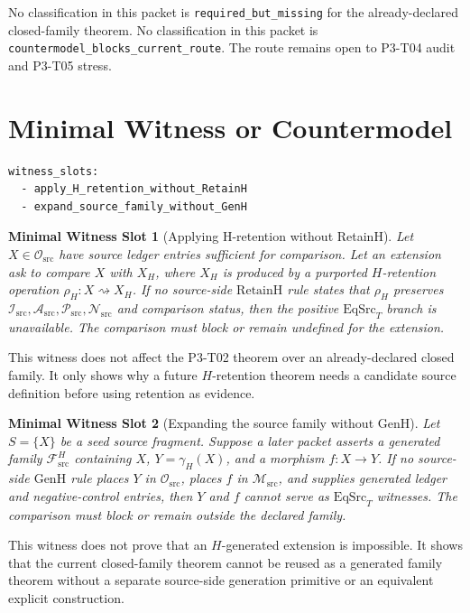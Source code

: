 \documentclass[11pt]{article}
\newcommand{\EqSrcT}{\mathrm{EqSrc}_{T}}
\newcommand{\RetainH}{\mathrm{RetainH}}
\newcommand{\GenH}{\mathrm{GenH}}
\newcommand{\Fsrc}{\mathcal{F}_{\mathrm{src}}}
\newcommand{\Osrc}{\mathcal{O}_{\mathrm{src}}}
\newcommand{\Msrc}{\mathcal{M}_{\mathrm{src}}}
\newcommand{\Isrc}{\mathcal{I}_{\mathrm{src}}}
\newcommand{\Asrc}{\mathcal{A}_{\mathrm{src}}}
\newcommand{\Psrc}{\mathcal{P}_{\mathrm{src}}}
\newcommand{\Nsrc}{\mathcal{N}_{\mathrm{src}}}
\newcommand{\Hret}{\rho_{H}}
\newcommand{\Hgen}{\gamma_{H}}
\newtheorem{witness}{Minimal Witness Slot}
\begin{document}
No classification in this packet is \texttt{required\_but\_missing} for the
already-declared closed-family theorem. No classification in this packet is
\texttt{countermodel\_blocks\_current\_route}. The route remains open to
P3-T04 audit and P3-T05 stress.

\section{Minimal Witness or Countermodel}

\begin{verbatim}
witness_slots:
  - apply_H_retention_without_RetainH
  - expand_source_family_without_GenH
\end{verbatim}

\begin{witness}[Applying H-retention without RetainH]
Let \(X\in\Osrc\) have source ledger entries sufficient for comparison. Let an
extension ask to compare \(X\) with \(X_{H}\), where \(X_{H}\) is produced by a
purported \(H\)-retention operation \(\Hret:X\rightsquigarrow X_{H}\). If no
source-side \(\RetainH\) rule states that \(\Hret\) preserves
\(\Isrc,\Asrc,\Psrc,\Nsrc\) and comparison status, then the positive
\(\EqSrcT\) branch is unavailable. The comparison must block or remain
undefined for the extension.
\end{witness}

This witness does not affect the P3-T02 theorem over an already-declared
closed family. It only shows why a future \(H\)-retention theorem needs a
candidate source definition before using retention as evidence.

\begin{witness}[Expanding the source family without GenH]
Let \(S=\{X\}\) be a seed source fragment. Suppose a later packet asserts a
generated family \(\Fsrc^{H}\) containing \(X\), \(Y=\Hgen(X)\), and a morphism
\(f:X\to Y\). If no source-side \(\GenH\) rule places \(Y\) in \(\Osrc\),
places \(f\) in \(\Msrc\), and supplies generated ledger and negative-control
entries, then \(Y\) and \(f\) cannot serve as \(\EqSrcT\) witnesses. The
comparison must block or remain outside the declared family.
\end{witness}

This witness does not prove that an \(H\)-generated extension is impossible. It
shows that the current closed-family theorem cannot be reused as a generated
family theorem without a separate source-side generation primitive or an
equivalent explicit construction.
\end{document}
